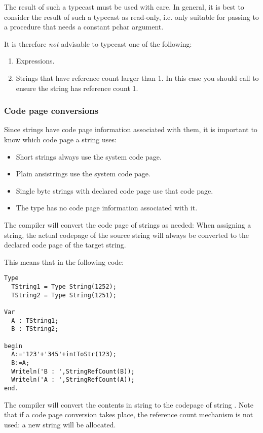 The result of such a typecast must be used with care. In general, it is best
to consider the result of such a typecast as read-only, i.e. only suitable for
passing to a procedure that needs a constant pchar argument.

It is therefore {\em not} advisable to typecast one of the following:
\begin{enumerate}
\item Expressions.
\item Strings that have reference count larger than 1.
In this case you should call  to ensure the 
string has reference count 1.
\end{enumerate}

\subsubsection{Code page conversions}
Since strings have code page information associated with them, it is important to know which code page a string uses:
\begin{itemize}
\item Short strings always use the system code page.
\item Plain ansistrings use the system code page.
\item Single byte strings with declared code page use that code page.
\item The  type has no code page information associated with it.
\end{itemize}
The compiler will convert the code page of strings as needed: When assigning a string,
the actual codepage of the source string will always be converted to the declared code 
page of the target string.

This means that in the following code:
\begin{verbatim}
Type
  TString1 = Type String(1252);
  TString2 = Type String(1251);

Var
  A : TString1;
  B : TString2;
  
begin
  A:='123'+'345'+intToStr(123);
  B:=A;
  Writeln('B : ',StringRefCount(B));
  Writeln('A : ',StringRefCount(A));
end.
\end{verbatim}
The compiler will convert the contents in string  to the codepage of string .
Note that if a code page conversion takes place, the reference count mechanism is not used: 
a new string will be allocated.

